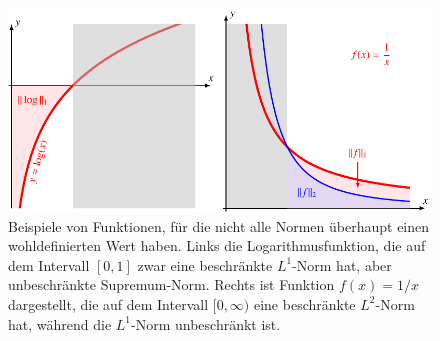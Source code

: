 %
%
%
\begin{figure}
\centering
\includegraphics{chapters/010-skalarprodukt/images/normbeispiele.pdf}
\caption{Beispiele von Funktionen, für die nicht alle Normen überhaupt
einen wohldefinierten Wert haben.
Links die Logarithmusfunktion, die auf dem Intervall $[0,1]$ zwar
eine beschränkte $L^1$-Norm hat, aber unbeschränkte Supremum-Norm.
Rechts ist Funktion $f(x)=1/x$ dargestellt, die auf dem Intervall
$[0,\infty)$ eine beschränkte $L^2$-Norm hat, während die $L^1$-Norm
unbeschränkt ist.
\label{buch:skalarprodukt:funktionenraeume:fig:normbeispiele}}
\end{figure}

